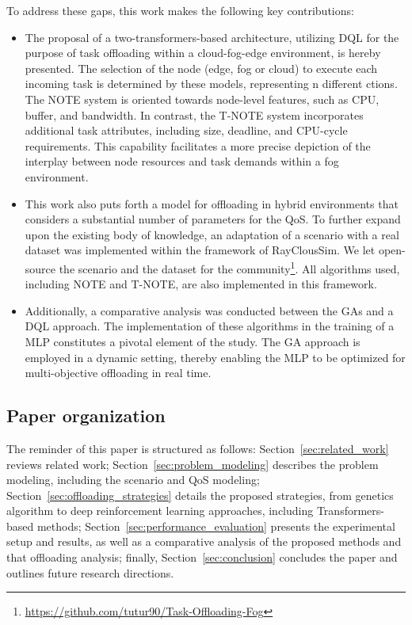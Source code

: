 \documentclass[preprint,3p,authoryear]{elsarticle}
\begin{document}
To address these gaps, this work makes the following key contributions:
\begin{itemize} 
    \item The proposal of a two-transformers-based architecture, utilizing DQL for the purpose of task offloading within a cloud-fog-edge environment, is hereby presented. The selection of the node (edge, fog or cloud) to execute each incoming task is determined by these models, representing n different ctions. The NOTE system is oriented towards node-level features, such as CPU, buffer, and bandwidth. In contrast, the T-NOTE system incorporates additional task attributes, including size, deadline, and CPU-cycle requirements. This capability facilitates a more precise depiction of the interplay between node resources and task demands within a fog environment.

    \item This work also puts forth a model for offloading in hybrid environments that considers a substantial number of parameters for the QoS. To further expand upon the existing body of knowledge, an adaptation of a scenario with a real dataset was implemented within the framework of RayClousSim. We let open-source the scenario and the dataset for the community\footnote{\url{https://github.com/tutur90/Task-Offloading-Fog}}. All algorithms used, including NOTE and T-NOTE, are also implemented in this framework.

    \item Additionally, a comparative analysis was conducted between the GAs and a DQL approach. The implementation of these algorithms in the training of a MLP constitutes a pivotal element of the study. The GA approach is employed in a dynamic setting, thereby enabling the MLP to be optimized for multi-objective offloading in real time.

\end{itemize}


\subsection{Paper organization}

The reminder of this paper is structured as follows: Section~\ref{sec:related_work} reviews related work; Section~\ref{sec:problem_modeling} describes the problem modeling, including the scenario and QoS modeling; Section~\ref{sec:offloading_strategies} details the proposed strategies, from genetics algorithm to deep reinforcement learning approaches, including Transformers-based methods; Section~\ref{sec:performance_evaluation} presents the experimental setup and results, as well as a comparative analysis of the proposed methods and that offloading analysis; finally, Section~\ref{sec:conclusion} concludes the paper and outlines future research directions.
\end{document}
